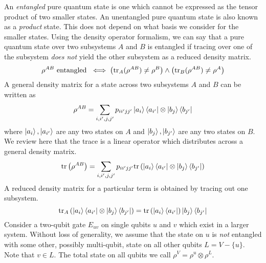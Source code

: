An \emph{entangled} pure quantum state is one which cannot be expressed as the
tensor product of two smaller states. An unentangled pure quantum state
is also known as a \emph{product} state. This does not depend on what basis
we consider for the smaller states. Using the density operator formalism,
we can say that a pure quantum state over two subsystems $A$ and $B$ is
entangled if tracing over one of the subsystem \emph{does not}
yield the other subsystem as a reduced density matrix.
%
\begin{equation}
\rho^{AB} \text{ entangled }
\iff \left( \text{tr}_{A}(\rho^{AB}) \ne \rho^{B} \right) \land
\left(\text{tr}_{B}(\rho^{AB}) \ne \rho^{A} \right)
\end{equation}
%
A general density matrix for a state across two subsystems $A$ and $B$ can be
written as
%
\begin{equation}
\rho^{AB} = \sum_{i,i',j,j'} p_{ii'jj'} \left\vert{a_i}\right\rangle\left\langle{a_{i'}}\right\vert \otimes \left\vert{b_j}\right\rangle\left\langle{b_{j'}}\right\vert
\end{equation}
where $\left\vert{a_i}\right\rangle,\left\vert{a_{i'}}\right\rangle$ are any two states on $A$ and
$\left\vert{b_j}\right\rangle,\left\vert{b_{j'}}\right\rangle$ are any two states on $B$.
%
We review here that the trace is a linear operator which distributes across
a general density matrix.
%
\begin{equation}
\text{tr}\left(\rho^{AB}\right) = \sum_{i,i',j,j'} p_{ii'jj'} \text{tr} \left(\left\vert{a_i}\right\rangle\left\langle{a_{i'}}\right\vert \otimes \left\vert{b_j}\right\rangle\left\langle{b_{j'}}\right\vert\right)
\end{equation}
%
A reduced density matrix for a particular term is obtained by tracing out
one subsystem.
%
\begin{equation}
\text{tr}_A\left(\left\vert{a_i}\right\rangle\left\langle{a_{i'}}\right\vert \otimes \left\vert{b_j}\right\rangle\left\langle{b_{j'}}\right\vert\right) = \text{tr}\left(\left\vert{a_i}\right\rangle\left\langle{a_{i'}}\right\vert\right) \left\vert{b_j}\right\rangle\left\langle{b_{j'}}\right\vert
\end{equation}
%
Consider a two-qubit gate $E_{uv}$ on single qubits $u$ and $v$ which exist
in a larger system.
Without loss of generality, we assume that the state on $u$ is
\emph{not} entangled with some other, possibly multi-qubit,
state on all other qubits $L = V - \{u\}$. Note that $v \in L$.
The total state on all qubits we call $\rho^{V} = \rho^{u} \otimes \rho^{L}$.


